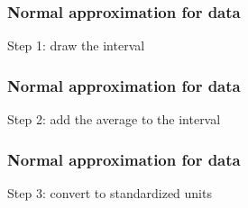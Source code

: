 \documentclass[handout]{beamer}
\begin{document}
   \begin{frame}
   \frametitle{Normal approximation for data}
   \begin{center}
   \end{center}
   Step 1: draw the interval
   \end{frame}



   \begin{frame}
   \frametitle{Normal approximation for data}
   \begin{center}
   \end{center}
   Step 2: add the average to the interval
   \end{frame}



   \begin{frame}
   \frametitle{Normal approximation for data}
   \begin{center}
   \end{center}
   Step 3: convert to standardized units
   \end{frame}

\end{document}
